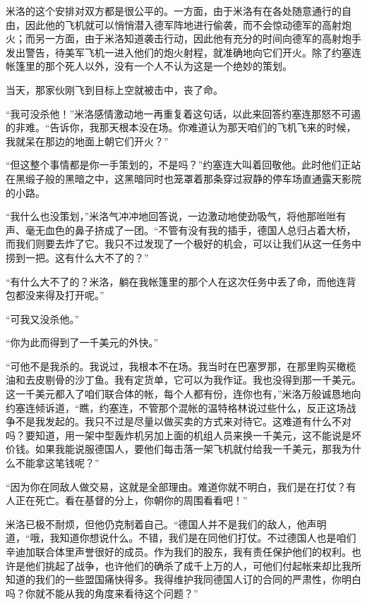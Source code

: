     米洛的这个安排对双方都是很公平的。一方面，由于米洛有在各处随意通行的自由，因此他的飞机就可以悄悄潜入德军阵地进行偷袭，而不会惊动德军的高射炮火；而另一方面，由于米洛知道袭击行动，因此他有充分的时间向德军的高射炮手发出警告，待美军飞机一进入他们的炮火射程，就准确地向它们开火。除了约塞连帐篷里的那个死人以外，没有一个人不认为这是一个绝妙的策划。

    当天，那家伙刚飞到目标上空就被击中，丧了命。

    “我可没杀他！”米洛感情激动地一再重复着这句话，以此来回答约塞连那怒不可遏的非难。“告诉你，我那天根本没在场。你难道认为那天咱们的飞机飞来的时候，我就呆在那边的地面上朝它们开火？”

    “但这整个事情都是你一手策划的，不是吗？”约塞连大叫着回敬他。此时他们正站在黑缎子般的黑暗之中，这黑暗同时也笼罩着那条穿过寂静的停车场直通露天影院的小路。

    “我什么也没策划，”米洛气冲冲地回答说，一边激动地使劲吸气，将他那咝咝有声、毫无血色的鼻子挤成了一团。“不管有没有我的插手，德国人总归占着大桥，而我们则要去炸了它。我只不过发现了一个极好的机会，可以让我们从这一任务中捞到一把。这有什么大不了的？”

    “有什么大不了的？米洛，躺在我帐篷里的那个人在这次任务中丢了命，而他连背包都没来得及打开呢。”

    “可我又没杀他。”

    “你为此而得到了一千美元的外快。”

    “可他不是我杀的。我说过，我根本不在场。我当时在巴塞罗那，在那里购买橄榄油和去皮剔骨的沙丁鱼。我有定货单，它可以为我作证。我也没得到那一千美元。这一千美元都入了咱们联合体的帐，每个人都有份，连你也有，”米洛万般诚恳地向约塞连倾诉道，“瞧，约塞连，不管那个混帐的温特格林说过些什么，反正这场战争不是我发起的。我只不过是尽量以做买卖的方式来对待它。这难道有什么不对吗？要知道，用一架中型轰炸机另加上面的机组人员来换一千美元，这不能说是坏价钱。如果我能说服德国人，要他们每击落一架飞机就付给我一千美元，那我为什么不能拿这笔钱呢？”

    “因为你在同敌人做交易，这就是全部理由。难道你就不明白，我们是在打仗？有人正在死亡。看在基督的分上，你朝你的周围看看吧！”
 


    米洛已极不耐烦，但他仍克制着自己。“德国人并不是我们的敌人，他声明道，“哦，我知道你想说什么。不错，我们是在同他们打仗。不过德国人也是咱们辛迪加联合体里声誉很好的成员。作为我们的股东，我有责任保护他们的权利。也许是他们挑起了战争，也许他们的确杀了成千上万的人，可他们付起帐来却比我所知道的我们的一些盟国痛快得多。我得维护我同德国人订的合同的严肃性，你明白吗？你就不能从我的角度来看待这个问题？”

